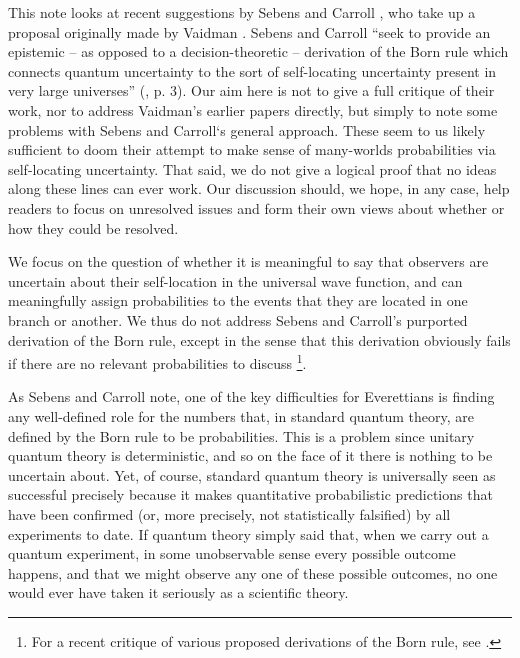 \documentclass[aps,prl,12pt]{revtex4}
\begin{document}
This note looks at recent suggestions by
Sebens and Carroll \cite{cs1,cs2}, who take up a proposal
originally made by Vaidman \cite{vaidman1998,vaidman2008,vaidman2011}. 
Sebens and Carroll 
 ``seek to provide an epistemic -- as
opposed to a decision-theoretic -- derivation of the Born rule which
connects quantum uncertainty to the sort of self-locating uncertainty
present in very large universes'' (\cite{cs1}, p. 3).  
Our aim here is not to give a full critique of their work, nor 
to address Vaidman's earlier papers directly,  
but simply to note some problems with 
Sebens and Carroll`s general approach. 
These seem to us likely sufficient
to doom their attempt to make sense of many-worlds probabilities
via self-locating uncertainty.  That said, we do not give a  
logical proof that no ideas along these lines can ever work.
Our discussion should, we hope, in any case, help readers
to focus on unresolved issues and form their own views 
about whether or how they could be resolved.  

We focus on the question of whether it is meaningful
to say that observers are uncertain about their self-location
in the universal wave function, and can meaningfully assign
probabilities to the events that they are located in one branch
or another.  We thus do not address Sebens and Carroll's 
purported derivation of the Born rule, except in the sense
that this derivation obviously fails if there are no relevant
probabilities to discuss \footnote{For a recent critique of
various proposed derivations of the Born 
rule, see \cite{kastner2014einselection}.}. 

As Sebens and Carroll note, one of the key difficulties for Everettians is
finding any well-defined role for the numbers that, in standard
quantum theory, are defined by the Born rule to be probabilities.
This is a problem since unitary quantum theory is deterministic,
and so on the face of it there is nothing to be uncertain about.
Yet, of course, standard quantum theory is universally seen as
successful precisely because it makes quantitative probabilistic predictions
that have been confirmed (or, more precisely, not statistically 
falsified) by all experiments to date.   If quantum theory simply
said that, when we
carry out a quantum experiment, in some unobservable sense every
possible outcome happens, 
and that we might observe any one of these possible outcomes, 
no one would ever have taken it
seriously as a scientific theory.  
\end{document}
